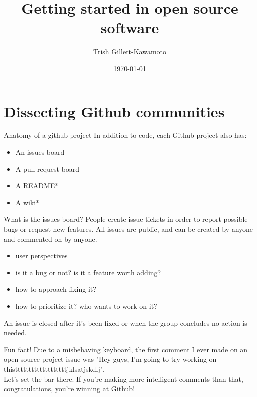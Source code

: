 \documentclass{beamer}
\title{Getting started in open source software}
\author{Trish Gillett-Kawamoto}
\date{\today}
\institute{Pyladies Montreal}
\begin{document}
\begin{frame}[plain,t]
\titlepage
\end{frame}

\section{Dissecting Github communities}

\begin{frame}
	\centering
\end{frame}

\begin{frame}{Anatomy of a github project}
	In addition to code, each Github project also has:
	\vskip8pt
	\begin{itemize}
		\item An issues board
		\item A pull request board
		\item A README\alert{*}
		\item A wiki\alert{*}
	\end{itemize}
\end{frame}

\begin{frame}{What is the issues board?}
	People create issue tickets in order to report possible bugs or request new features.  All issues are public, and can be created by anyone and commented on by anyone.\\[8pt]
	\begin{itemize}
		\item user perspectives
		\item is it a bug or not? is it a feature worth adding?
		\item how to approach fixing it?
		\item how to prioritize it? who wants to work on it?
	\end{itemize}
	\vskip16pt
	An issue is closed after it's been fixed or when the group concludes no action is needed.
\end{frame}

\begin{frame}{Fun fact!}
Due to a misbehaving keyboard, the first comment I ever made on an open source project issue was \alert{"Hey guys, I'm going to try working on thistttttttttttttttttttjklsatjskdlj"}.\\[12pt]

Let's set the bar there.  If you're making more intelligent comments than that, congratulations, you're winning at Github!
\end{frame}
\end{document}
